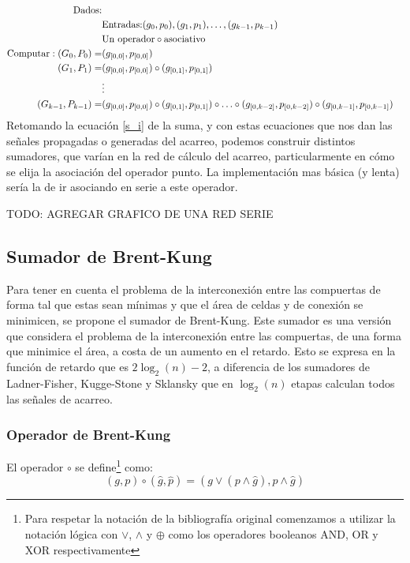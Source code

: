 \begin{equation}
\begin{align}
\text{Dados:}\\
 & \text{Entradas:} (g_0,p_0),(g_1,p_1),\dotsc,(g_{k-1},p_{k-1}) \\
 & \text{Un operador} \circ \text{asociativo}\\ 
\text{Computar}:
(G_0,P_0) = &(g_{[0,0]},p_{[0,0]})\notag\\
(G_1,P_1) = &(g_{[0,0]},p_{[0,0]})\circ(g_{[0,1]},p_{[0,1]})\notag\\
&\vdots \nonumber \\
(G_{k-1},P_{k-1}) = &(g_{[0,0]},p_{[0,0]})\circ(g_{[0,1]},p_{[0,1]})\circ \dotsc \circ(g_{[0,k-2]},p_{[0,k-2]})\circ(g_{[0,k-1]},p_{[0,k-1]})\notag
\end{align}
\end{equation}
Retomando la ecuación \ref{s_i} de la suma, y con estas ecuaciones que nos dan las señales propagadas o generadas del acarreo, podemos construir distintos sumadores, que varían en la red de cálculo del acarreo, particularmente en cómo se elija la asociación del operador punto. La implementación mas básica (y lenta) sería la de ir asociando en serie a este operador.  

TODO: AGREGAR GRAFICO DE UNA RED SERIE




\subsection {Sumador de Brent-Kung}
Para tener en cuenta el problema de la interconexión entre las compuertas de forma tal que estas sean mínimas y que el área de celdas y de conexión se minimicen, se propone el sumador de Brent-Kung. Este sumador \cite{brent-kung} es una versión que considera el problema de la interconexión entre las compuertas, de una forma que minimice el área, a costa de un aumento en el retardo. Esto se expresa en la función de retardo que es \(2\log_2(n)-2\), a diferencia de los sumadores de Ladner-Fisher\cite{ladner-fischer}, Kugge-Stone\cite{kogge-stone} y Sklansky\cite{sklansky} que en \(\log_2(n)\) etapas calculan todos las señales de acarreo. 


\subsubsection {Operador de Brent-Kung}
El operador $\circ$ se define\footnote{Para respetar la notación de la bibliografía original comenzamos a utilizar la notación lógica con \(\vee\), \(\wedge\) y \(\oplus\) como los operadores booleanos AND, OR y XOR respectivamente} como:
\begin{equation}
(g,p) \circ (\hat{g},\hat{p}) = (g\vee(p\wedge\hat{g}),p\wedge\hat{g})\label{gap}
\end{equation}

